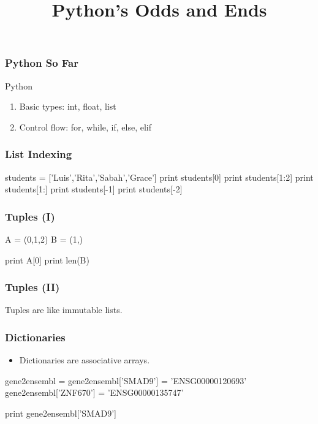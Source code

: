 
\title{Python's Odds and Ends}

\frame{\maketitle}

\begin{frame}[fragile]
\frametitle{Python So Far}

\begin{block}{Python}
\begin{enumerate}
\item Basic types: int, float, list
\item Control flow: for, while, if, else, elif
\end{enumerate}
\end{block}

\end{frame}

\begin{frame}[fragile]
\frametitle{List Indexing}

\begin{python}
students = ['Luis','Rita','Sabah','Grace']
print students[0]
print students[1:2]
print students[1:]
print students[-1]
print students[-2]
\end{python}
\end{frame}

\begin{frame}[fragile]
\frametitle{Tuples (I)}
\begin{python}
A = (0,1,2)
B = (1,)

print A[0]
print len(B)
\end{python}

\end{frame}

\begin{frame}[fragile]
\frametitle{Tuples (II)}
Tuples are like \alert{immutable} lists.
\end{frame}

\begin{frame}[fragile]
\frametitle{Dictionaries}

\begin{itemize}
\item Dictionaries are \alert{associative arrays}.
\end{itemize}

\begin{python}
gene2ensembl = {}
gene2ensembl['SMAD9'] = 'ENSG00000120693'
gene2ensembl['ZNF670'] = 'ENSG00000135747'

print gene2ensembl['SMAD9']
\end{python}
\end{frame}

